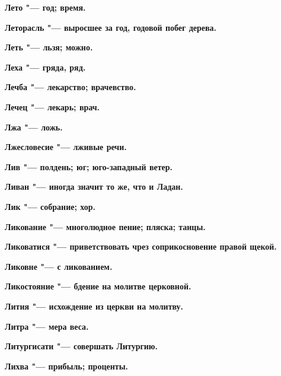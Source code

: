 \begin{mymulticols}{2}
\bfseries Лето\normalfont{} "--- год; время. 




\bfseries Леторасль\normalfont{} "--- выросшее за год, годовой побег дерева. 




\bfseries Леть\normalfont{} "--- льзя; можно. 




\bfseries Леха\normalfont{} "--- гряда, ряд. 




\bfseries Лечба\normalfont{} "--- лекарство; врачевство. 




\bfseries Лечец\normalfont{} "--- лекарь; врач. 




\bfseries Лжа\normalfont{} "--- ложь. 




\bfseries Лжесловесие\normalfont{} "--- лживые речи. 




\bfseries Лив\normalfont{} "--- полдень; юг; юго-западный ветер. 




\bfseries Ливан\normalfont{} "--- иногда значит то же, что и Ладан. 




\bfseries Лик\normalfont{} "--- собрание; хор. 




\bfseries Ликование\normalfont{} "--- многолюдное пение; пляска; танцы. 




\bfseries Ликоватися\normalfont{} "--- приветствовать чрез соприкосновение правой щекой. 




\bfseries Ликовне\normalfont{} "--- с ликованием. 




\bfseries Ликостояние\normalfont{} "--- бдение на молитве церковной. 




\bfseries Лития\normalfont{} "--- исхождение из церкви на молитву. 




\bfseries Литра\normalfont{} "--- мера веса. 




\bfseries Литургисати\normalfont{} "--- совершать Литургию. 




\bfseries Лихва\normalfont{} "--- прибыль; проценты. 





\end{mymulticols}
